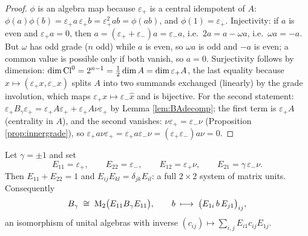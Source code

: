 \begin{proof}
$\phi$ is an algebra map because $\varepsilon_+$ is a central idempotent of $A$: $\phi(a)\phi(b) = \varepsilon_+ a\, \varepsilon_+ b = \varepsilon_+^2 ab = \phi(ab)$, and $\phi(1) = \varepsilon_+$. Injectivity: if $a$ is even and $\varepsilon_+ a = 0$, then $a = (\varepsilon_+ + \varepsilon_-)a = \varepsilon_- a$, i.e.\ $2a = a - \omega a$, i.e.\ $\omega a = -a$. But $\omega$ has odd grade ($n$ odd) while $a$ is even, so $\omega a$ is odd and $-a$ is even; a common value is possible only if both vanish, so $a = 0$. Surjectivity follows by dimension: $\dim \mathrm{Cl}^0 = 2^{n-1} = \tfrac12 \dim A = \dim \varepsilon_+ A$, the last equality because $x \mapsto (\varepsilon_+ x, \varepsilon_- x)$ splits $A$ into two summands exchanged (linearly) by the grade involution, which maps $\varepsilon_+ x \mapsto \varepsilon_- \hat{x}$ and is bijective. For the second statement: $\varepsilon_+ B_\gamma \varepsilon_+ = \varepsilon_+ A \varepsilon_+ + \varepsilon_+ A \nu \varepsilon_+$ by Lemma \ref{lem:BAdecomp}; the first term is $\varepsilon_+ A$ (centrality in $A$), and the second vanishes: $\nu \varepsilon_+ = \varepsilon_- \nu$ (Proposition \ref{prop:innergrade}), so $\varepsilon_+ a \nu \varepsilon_+ = \varepsilon_+ a \varepsilon_- \nu = (\varepsilon_+ \varepsilon_-) a \nu = 0$.
\end{proof}

\begin{lemma}\label{lem:matrixunits}
Let $\gamma = \pm 1$ and set
\[
E_{11} = \varepsilon_+, \qquad E_{22} = \varepsilon_-, \qquad E_{12} = \varepsilon_+ \nu, \qquad E_{21} = \gamma\, \varepsilon_- \nu .
\]
Then $E_{11} + E_{22} = 1$ and $E_{ij} E_{kl} = \delta_{jk} E_{il}$: a full $2 \times 2$ system of matrix units. Consequently
\[
B_\gamma \;\cong\; \mathrm{M}_2\bigl(E_{11} B_\gamma E_{11}\bigr), \qquad b \;\longmapsto\; \bigl(E_{1i}\, b\, E_{j1}\bigr)_{ij},
\]
an isomorphism of unital algebras with inverse $(c_{ij}) \mapsto \sum_{i,j} E_{i1} c_{ij} E_{1j}$.
\end{lemma}

